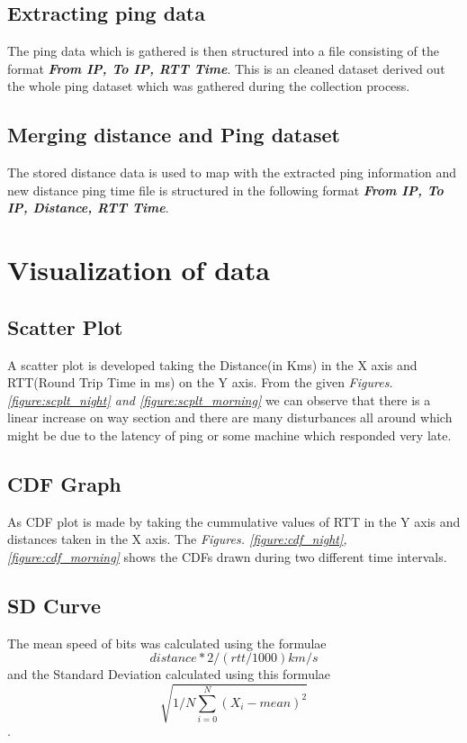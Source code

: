 \documentclass[twocolumn]{article}
\begin{document}
\subsection{Extracting ping data}
The ping data which is gathered is then structured into a file consisting of the format  \textbf{\textit{From IP, To IP, RTT Time}}. This is an cleaned dataset derived out the whole ping dataset which was gathered during the collection process.

\subsection{Merging distance and Ping dataset}
The stored distance data is used to map with the extracted ping information and new distance ping time file is structured in the following format \textbf{\textit{From IP, To IP, Distance, RTT Time}}.

\section{Visualization of data}

\subsection{Scatter Plot}
A scatter plot is developed taking the Distance(in Kms) in the X axis and RTT(Round Trip Time in ms) on the Y axis.
From the given \textit{Figures.\ref{figure:scplt_night} and \ref{figure:scplt_morning}}  we can observe that there is a linear increase on way section and there are many disturbances all around which might be due to the latency of ping or some machine which responded very late.

\subsection{CDF Graph}
As CDF plot is made by taking the cummulative values of RTT in the Y axis and distances taken in the X axis. The \textit{Figures. \ref{figure:cdf_night}, \ref{figure:cdf_morning}} shows the CDFs drawn during two different time intervals.

\subsection{SD Curve}
The mean speed of bits was calculated using the formulae $${distance*2/(rtt/1000)}km/s$$ and the Standard Deviation calculated using this formulae $$ \sqrt{1/N\sum_{i=0}^{N}{(X_i- mean)^2}} $$.
\end{document}
